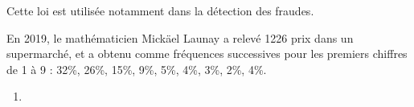 {{\begin{tikzpicture}[font=\small]
\end{tikzpicture}
Cette loi est utilisée notamment dans la détection des fraudes. 

En 2019, le mathématicien Mickäel Launay a relevé 1226 prix dans un supermarché, et a obtenu comme fréquences successives pour les premiers chiffres de 1 à 9 : 32\%, 26\%, 15\%, 9\%, 5\%, 4\%, 3\%, 2\%, 4\%.
}


\begin{enumerate}
    \item {}
\end{enumerate}

}
